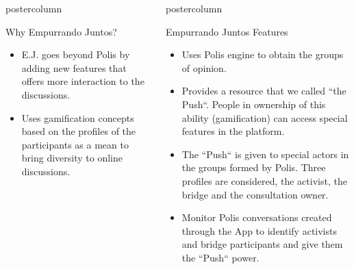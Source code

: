 \documentclass[final,hyperref={pdfpagelabels=false}]{beamer}
\newlength{\columnheight}
\begin{document}
\begin{frame}
\begin{columns}
\begin{column}{.49\textwidth}
\begin{beamercolorbox}[center,wd=\textwidth]{postercolumn}
\begin{minipage}[T]{.95\textwidth}
{\begin{block}{Why Empurrando Juntos?}
  \begin{itemize}
    \item E.J. goes beyond Polis by adding new features that offers more interaction
    to the discussions.

    \item Uses gamification concepts based on the profiles of the participants as
    a mean to bring diversity to online discussions.
  \end{itemize}
\end{block}


}
\end{minipage}
\end{beamercolorbox}
\end{column}

\begin{column}{.49\textwidth}
  \begin{beamercolorbox}[center,wd=\textwidth]{postercolumn}
    \begin{minipage}[T]{.95\textwidth} %
      \parbox[t][\columnheight]{\textwidth}{ %

\begin{block}{Empurrando Juntos Features}
  \begin{itemize}
    \item Uses Polis engine to obtain the groups of opinion.

    \item Provides a resource that we called ``the Push``. People in ownership of
    this ability (gamification) can access special features in the platform.

    \item The ``Push`` is given to special actors in the groups formed by Polis.
    Three profiles are considered, the activist, the bridge and the consultation
    owner.

    \item Monitor Polis conversations created through the App
    to identify activists and bridge participants and give them the ``Push``
    power.


\end{itemize}
\end{block}}
\end{minipage}
\end{beamercolorbox}
\end{column}
\end{columns}
\end{frame}
\end{document}
